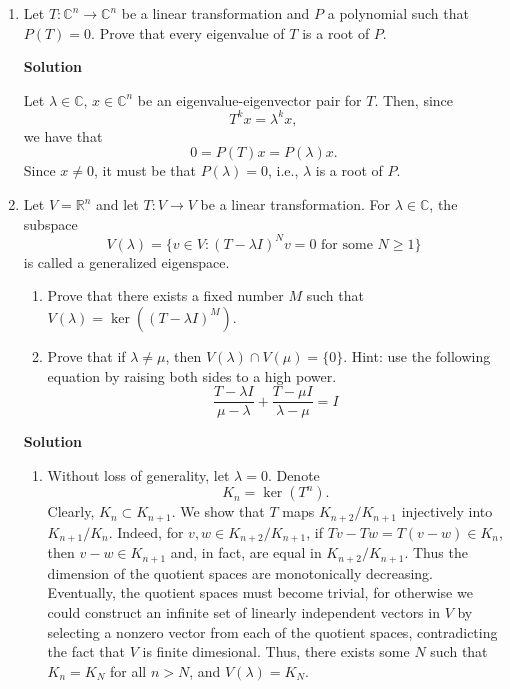 \documentclass{article}
\begin{document}
\begin{enumerate}
\begin{enumerate}
\end{enumerate}



\item Let \(T : \mathbb{C}^n \to \mathbb{C}^n\) be a linear transformation and \(P\) a polynomial such that \(P(T) = 0\).  Prove that every eigenvalue of \(T\) is a root of \(P\).

{\bf Solution}

Let \(\lambda \in \mathbb{C}\), \(x \in \mathbb{C}^n\) be an eigenvalue-eigenvector pair for \(T\).  Then, since
\[T^kx = \lambda^kx,\]
we have that
\[0 = P(T)x = P(\lambda)x.\]
Since \(x \neq 0\), it must be that \(P(\lambda) = 0\), i.e., \(\lambda\) is a root of \(P\).



\item Let \(V = \mathbb{R}^n\) and let \(T : V \to V\) be a linear transformation.  For \(\lambda \in \mathbb{C}\), the subspace
\[V(\lambda) = \{v \in V : (T - \lambda I)^N v = 0 \text{ for some } N \geq 1\}\]
is called a generalized eigenspace.

\begin{enumerate}
\item Prove that there exists a fixed number \(M\) such that \(V(\lambda) = \ker((T - \lambda I)^M)\).

\item Prove that if \(\lambda \neq \mu\), then \(V(\lambda) \cap V(\mu) = \{0\}\).  Hint:  use the following equation by raising both sides to a high power.
\[\frac{T - \lambda I}{\mu - \lambda} + \frac{T - \mu I}{\lambda - \mu} = I\]

\end{enumerate}

{\bf Solution}

\begin{enumerate}
\item Without loss of generality, let \(\lambda = 0\).  Denote
\[K_n = \ker(T^n).\]
Clearly, \(K_n \subset K_{n + 1}\).  We show that \(T\) maps \(K_{n + 2} / K_{n + 1}\) injectively into \(K_{n + 1} / K_n\).  Indeed, for \(v,w \in K_{n + 2} / K_{n + 1}\), if \(Tv - Tw = T(v - w) \in K_n\), then \(v - w \in K_{n + 1}\) and, in fact, are equal in \(K_{n + 2} / K_{n + 1}\).  Thus the dimension of the quotient spaces are monotonically decreasing.  Eventually, the quotient spaces must become trivial, for otherwise we could construct an infinite set of linearly independent vectors in \(V\) by selecting a nonzero vector from each of the quotient spaces, contradicting the fact that \(V\) is finite dimesional.  Thus, there exists some \(N\) such that \(K_n = K_N\) for all \(n > N\), and \(V(\lambda) = K_N\).


\end{enumerate}
\end{enumerate}
\end{document}
